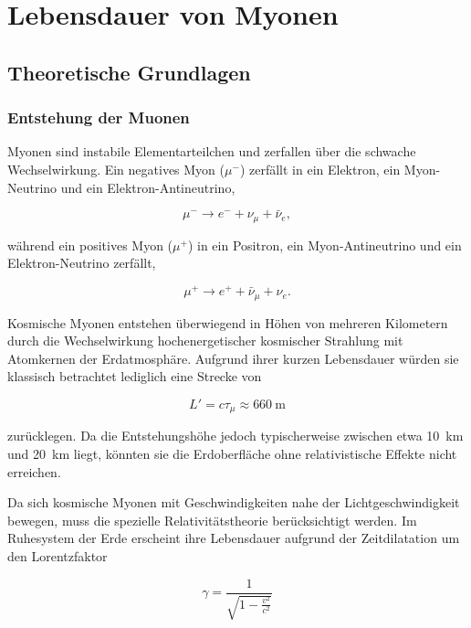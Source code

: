 \chapter{Lebensdauer von Myonen}
\section{Theoretische Grundlagen}
\subsection{Entstehung der Muonen}

Myonen sind instabile Elementarteilchen und zerfallen über die schwache Wechselwirkung. Ein negatives Myon ($\mu^-$) zerfällt in ein Elektron, ein Myon-Neutrino und ein Elektron-Antineutrino,

\begin{equation}
    \mu^- \rightarrow e^- + \nu_\mu + \bar{\nu}_e,
\end{equation}

während ein positives Myon ($\mu^+$) in ein Positron, ein Myon-Antineutrino und ein Elektron-Neutrino zerfällt,

\begin{equation}
    \mu^+ \rightarrow e^+ + \bar{\nu}_\mu + \nu_e.
\end{equation}

Kosmische Myonen entstehen überwiegend in Höhen von mehreren Kilometern durch die Wechselwirkung hochenergetischer kosmischer Strahlung mit Atomkernen der Erdatmosphäre. Aufgrund ihrer kurzen Lebensdauer würden sie klassisch betrachtet lediglich eine Strecke von

\begin{equation}
    L' = c\tau_\mu
        \approx
        \SI{660}{\meter}
\end{equation}

zurücklegen. Da die Entstehungshöhe jedoch typischerweise zwischen etwa \SI{10}{\kilo\meter} und \SI{20}{\kilo\meter} liegt, könnten sie die Erdoberfläche ohne relativistische Effekte nicht erreichen.

Da sich kosmische Myonen mit Geschwindigkeiten nahe der Lichtgeschwindigkeit bewegen, muss die spezielle Relativitätstheorie berücksichtigt werden. Im Ruhesystem der Erde erscheint ihre Lebensdauer aufgrund der Zeitdilatation um den Lorentzfaktor

\begin{equation}
    \gamma=\frac{1}{\sqrt{1-\frac{v^2}{c^2}}}
\end{equation}

